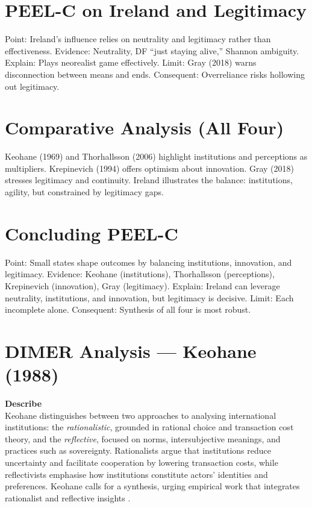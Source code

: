 \section*{PEEL-C on Ireland and Legitimacy}

Point: Ireland’s influence relies on neutrality and legitimacy rather than effectiveness.  
Evidence: Neutrality, DF “just staying alive,” Shannon ambiguity.  
Explain: Plays neorealist game effectively.  
Limit: Gray (2018) warns disconnection between means and ends.  
Consequent: Overreliance risks hollowing out legitimacy.  

\section*{Comparative Analysis (All Four)}

Keohane (1969) and Thorhallsson (2006) highlight institutions and perceptions as multipliers. Krepinevich (1994) offers optimism about innovation. Gray (2018) stresses legitimacy and continuity. Ireland illustrates the balance: institutions, agility, but constrained by legitimacy gaps.  

\section*{Concluding PEEL-C}

Point: Small states shape outcomes by balancing institutions, innovation, and legitimacy.  
Evidence: Keohane (institutions), Thorhallsson (perceptions), Krepinevich (innovation), Gray (legitimacy).  
Explain: Ireland can leverage neutrality, institutions, and innovation, but legitimacy is decisive.  
Limit: Each incomplete alone.  
Consequent: Synthesis of all four is most robust.  

\section*{DIMER Analysis — Keohane (1988)}

\textbf{Describe} \\
Keohane distinguishes between two approaches to analysing international institutions: the \textit{rationalistic}, grounded in rational choice and transaction cost theory, and the \textit{reflective}, focused on norms, intersubjective meanings, and practices such as sovereignty. Rationalists argue that institutions reduce uncertainty and facilitate cooperation by lowering transaction costs, while reflectivists emphasise how institutions constitute actors’ identities and preferences. Keohane calls for a synthesis, urging empirical work that integrates rationalist and reflective insights \parencite{KEOHANE_1988}.

